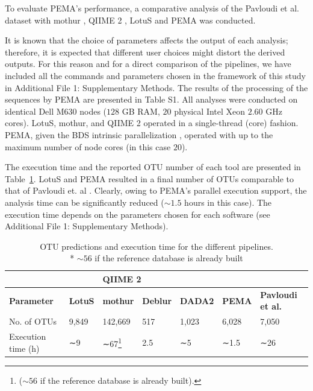    To evaluate PEMA's performance, a comparative analysis of the Pavloudi et al. \citep{pavloudi2017sediment} dataset with mothur \citep{schloss2009introducing}, QIIME 2 \citep{bolyen2018qiime}, LotuS \citep{hildebrand2014lotus} and PEMA was conducted.

   It is known that the choice of parameters affects the output of each analysis; 
   therefore, it is expected that different user choices might distort the derived outputs. 
   For this reason and for a direct comparison of the pipelines, we have included all the commands and parameters chosen in the framework of this study in Additional File 1: Supplementary Methods. 
   The results of the processing of the sequences by PEMA are presented in Table S1. 
   All analyses were conducted on identical Dell M630 nodes ($128$ GB RAM, $20$ physical Intel Xeon $2.60$ GHz cores). 
   LotuS, mothur, and QIIME 2 operated in a single-thread (core) fashion. 
   PEMA, given the BDS intrinsic parallelization \citep{cingolani2015bigdatascript}, operated with up to the maximum number of node cores (in this case $20$).

   The execution time and the reported OTU number of each tool are presented in Table~\ref{table:pema-compare-times}. 
   LotuS and PEMA resulted in a final number of OTUs comparable to that of Pavloudi et. al \citep{pavloudi2017sediment}. 
   Clearly, owing to PEMA's parallel execution support, the analysis time can be significantly reduced ($∼1.5$ hours in this case). 
   The execution time depends on the parameters chosen for each software (see Additional File 1: Supplementary Methods).

   \begin{table}[]
      \begin{tabular}{@{}lllllll@{}}
      \toprule
      \textbf{} & \textbf{} & \multicolumn{2}{l}{\textbf{QIIME 2}} & \textbf{} & \textbf{} &  \\ \midrule
      \textbf{Parameter} & \textbf{LotuS} & \textbf{mothur} & \textbf{Deblur} & \textbf{DADA2} & \textbf{PEMA} & \textbf{Pavloudi et al. \citep{pavloudi2017sediment}} \\
      No. of OTUs & 9,849 & 142,669 & 517 & 1,023 & 6,028 & 7,050 \\
      Execution time (h) & ∼9 & ∼67\footnote{($∼56$ if the reference database is already built).} & 2.5 & ∼5 & ∼1.5 & ∼26 \\ \bottomrule
      \end{tabular}
      \caption[OTU predictions and execution time for the different pipelines]{OTU predictions and execution time for the different pipelines. \\ * $∼56$ if the reference database is already built}
      \label{table:pema-compare-times}
   \end{table}


